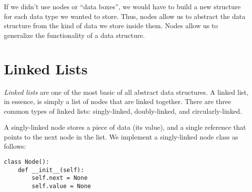 If we didn't use nodes or ``data boxes'', we would have to build a new structure for each data type we wanted to store.
Thus, nodes allow us to abstract the data structure from the kind of data we store inside them.
Nodes allow us to generalize the functionality of a data structure.

\section*{Linked Lists}
\emph{Linked lists} are one of the most basic of all abstract data structures.
A linked list, in essence, is simply a list of nodes that are linked together.
There are three common types of linked lists: singly-linked, doubly-linked, and circularly-linked.


\begin{center}
\end{center}
\begin{center}
\end{center}

A singly-linked node stores a piece of data (its value), and a single reference that points to the next node in the list.
We implement a singly-linked node class as follows:

\begin{lstlisting}
class Node():
    def __init__(self):
        self.next = None
        self.value = None
\end{lstlisting}

